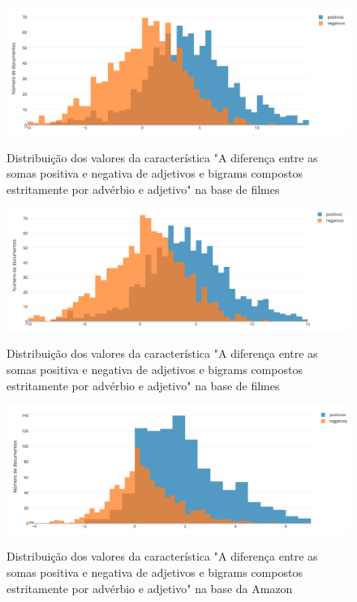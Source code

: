 \documentclass[template.tex]{subfiles}
\begin{document}
\begin{figure}[H]
\caption{Distribuição dos valores da característica "A diferença entre as somas positiva e negativa de adjetivos e bigrams compostos estritamente por advérbio e adjetivo" na base de filmes}
\centering
\includegraphics[scale=0.45]{movies_positive_to_negative_ratio_of_adjectives_sum_and_bigrams_with_adjectives}
\label{figura:movies_dist_1}
\end{figure}

\begin{figure}[H]
\caption{Distribuição dos valores da característica "A diferença entre as somas positiva e negativa de adjetivos e bigrams compostos estritamente por advérbio e adjetivo" na base de filmes}
\centering
\includegraphics[scale=0.45]{movies_positive_to_negative_ratio_of_unigrams_and_bigrams_sum}
\label{figura:movies_dist_2}
\end{figure}


\begin{figure}[H]
\caption{Distribuição dos valores da característica "A diferença entre as somas positiva e negativa de adjetivos e bigrams compostos estritamente por advérbio e adjetivo" na base da Amazon}
\centering
\includegraphics[scale=0.45]{amazon_positive_to_negative_ratio_of_adjectives_sum_and_bigrams_with_adjectives}
\label{figura:amazon_dist_1}
\end{figure}
\end{document}
